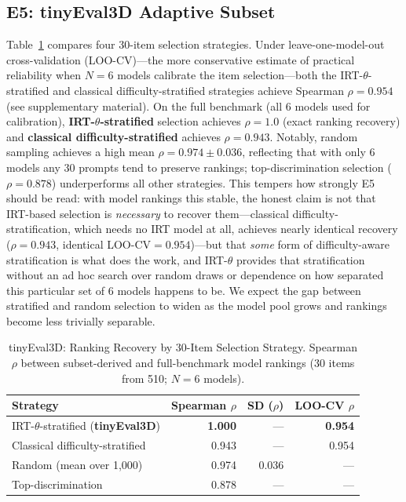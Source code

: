 \documentclass[10pt]{article}
\begin{document}
\subsection{E5: tinyEval3D Adaptive Subset}
\label{sec:e5}

Table~\ref{tab:subset} compares four 30-item selection strategies.
Under leave-one-model-out cross-validation (LOO-CV)---the more conservative
estimate of practical reliability when $N=6$ models calibrate the item
selection---both the IRT-$\theta$-stratified and classical difficulty-stratified
strategies achieve Spearman $\rho=0.954$ (see supplementary material).
On the full benchmark (all 6 models used for calibration),
\textbf{IRT-$\theta$-stratified} selection achieves $\rho=1.0$
(exact ranking recovery) and \textbf{classical difficulty-stratified}
achieves $\rho=0.943$.
Notably, random sampling achieves a high mean $\rho=0.974\pm0.036$, reflecting
that with only 6 models any 30 prompts tend to preserve rankings;
top-discrimination selection ($\rho=0.878$) underperforms all other strategies.
This tempers how strongly E5 should be read: with model rankings this
stable, the honest claim is not that IRT-based selection is
\emph{necessary} to recover them---classical difficulty-stratification,
which needs no IRT model at all, achieves nearly identical recovery
($\rho=0.943$, identical LOO-CV$=0.954$)---but that \emph{some} form of
difficulty-aware stratification is what does the work, and IRT-$\theta$
provides that stratification without an ad hoc search over random draws
or dependence on how separated this particular set of 6 models happens to
be. We expect the gap between stratified and random selection to widen as
the model pool grows and rankings become less trivially separable.

\begin{table}[h]
\centering
\small
\caption{tinyEval3D: Ranking Recovery by 30-Item Selection Strategy.
Spearman $\rho$ between subset-derived and full-benchmark model rankings
(30 items from 510; $N=6$ models).}
\label{tab:subset}
\begin{tabular}{lrrr}
\toprule
Strategy & Spearman $\rho$ & SD ($\rho$) & LOO-CV $\rho$ \\
\midrule
IRT-$\theta$-stratified (\textbf{tinyEval3D}) & \textbf{1.000} & — & \textbf{0.954} \\
Classical difficulty-stratified & 0.943 & — & 0.954 \\
Random (mean over 1{,}000) & 0.974 & 0.036 & — \\
Top-discrimination & 0.878 & — & — \\
\bottomrule
\end{tabular}
\end{table}
\end{document}
